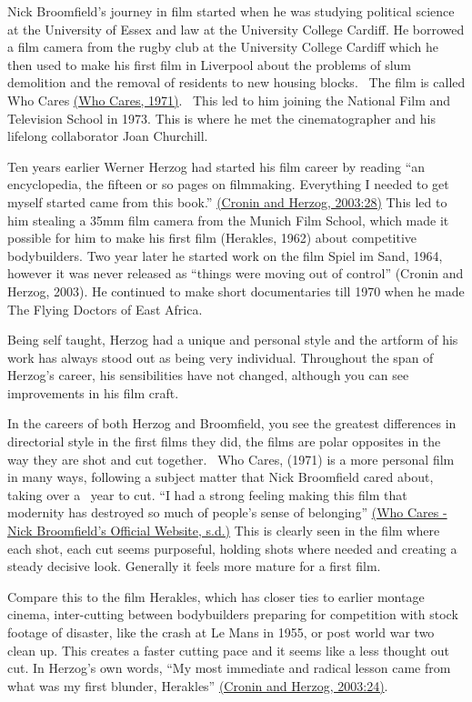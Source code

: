 \documentclass[
]{book}
\begin{document}
Nick Broomfield's journey in film started when he was studying political science at the University of Essex and law at the University College Cardiff. He borrowed a film camera from the rugby club at the University College Cardiff which he then used to make his first film in Liverpool about the problems of slum demolition and the removal of residents to new housing blocks.~ The film is called Who Cares \href{https://paperpile.com/c/SdLVV0/W0Hr/?noauthor=1}{(Who Cares, 1971)}.~ This led to him joining the National Film and Television School in 1973. This is where he met the cinematographer and his lifelong collaborator Joan Churchill.

Ten years earlier Werner Herzog had started his film career by reading ``an encyclopedia, the fifteen or so pages on filmmaking. Everything I needed to get myself started came from this book.'' \href{https://paperpile.com/c/SdLVV0/n5mQ/?locator=28}{(Cronin and Herzog, 2003:28)} This led to him stealing a 35mm film camera from the Munich Film School, which made it possible for him to make his first film (Herakles, 1962) about competitive bodybuilders. Two year later he started work on the film Spiel im Sand, 1964, however it was never released as ``things were moving out of control'' (Cronin and Herzog, 2003). He continued to make short documentaries till 1970 when he made The Flying Doctors of East Africa.

Being self taught, Herzog had a unique and personal style and the artform of his work has always stood out as being very individual. Throughout the span of Herzog's career, his sensibilities have not changed, although you can see improvements in his film craft.~

In the careers of both Herzog and Broomfield, you see the greatest differences in directorial style in the first films they did, the films are polar opposites in the way they are shot and cut together.~ Who Cares, (1971) is a more personal film in many ways, following a subject matter that Nick Broomfield cared about, taking over a~ year to cut. ``I had a strong feeling making this film that modernity has destroyed so much of people's sense of belonging'' \href{https://paperpile.com/c/SdLVV0/R1mx}{(Who Cares - Nick Broomfield's Official Website, s.d.)} This is clearly seen in the film where each shot, each cut seems purposeful, holding shots where needed and creating a steady decisive look. Generally it feels more mature for a first film.

Compare this to the film Herakles, which has closer ties to earlier montage cinema, inter-cutting between bodybuilders preparing for competition with stock footage of disaster, like the crash at Le Mans in 1955, or post world war two clean up. This creates a faster cutting pace and it seems like a less thought out cut. In Herzog's own words, ``My most immediate and radical lesson came from what was my first blunder, Herakles'' \href{https://paperpile.com/c/SdLVV0/n5mQ/?locator=24}{(Cronin and Herzog, 2003:24)}.
\end{document}
